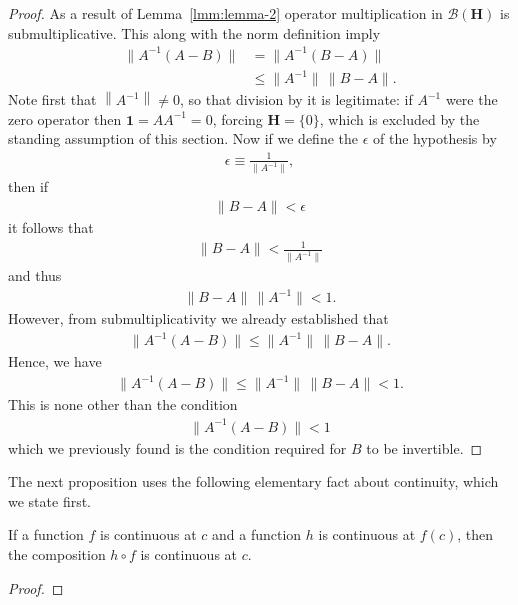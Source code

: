 \begin{proof}
As a result of Lemma~\ref{lmm:lemma-2} operator multiplication in $\mathcal{B}(\mathbf{H})$ is submultiplicative. This along with the norm definition imply
\begin{align}
    \|A^{-1}(A - B)\| &= \|A^{-1}(B - A)\| \\
                      &\le \|A^{-1}\| \, \|B - A\|.
\end{align}
Note first that $\left\| A^{-1} \right\| \ne 0$, so that division by it is legitimate: if $A^{-1}$ were the zero operator then $\mathbf{1} = AA^{-1} = 0$, forcing $\mathbf{H} = \{0\}$, which is excluded by the standing assumption of this section. Now if we define the $\epsilon$ of the hypothesis by
\begin{align}
    \epsilon \equiv \frac{1}{\|A^{-1}\|},
\end{align}
then if
\begin{align}
    \|B - A\| < \epsilon
\end{align}
it follows that
\begin{align}
    \|B - A\| < \frac{1}{\|A^{-1}\|}
\end{align}
and thus
\begin{align}
    \|B - A\| \, \|A^{-1}\| < 1.
\end{align}
However, from submultiplicativity we already established that
\begin{align}
    \|A^{-1}(A - B)\| \le \|A^{-1}\| \, \|B - A\|.
\end{align}
Hence, we have
\begin{align}
    \|A^{-1}(A - B)\| \le \|A^{-1}\| \, \|B - A\| < 1.
\end{align}
This is none other than the condition
\begin{align}
    \|A^{-1}(A - B)\| < 1
\end{align}
which we previously found is the condition required for $B$ to be invertible.
\end{proof}

The next proposition uses the following elementary fact about continuity, which we state first.

\begin{theorem}
    \label{thrm:composition-theorem}
    \leanok
    If a function $f$ is continuous at $c$ and a function $h$ is continuous at $f(c)$, then the composition $h \circ f$ is continuous at $c$.
\end{theorem}
\begin{proof}
\leanok
\end{proof}

